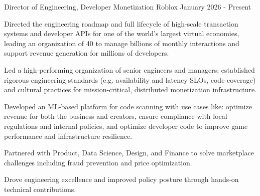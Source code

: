 

\begin{cventries}


  \cventry
    {Director of Engineering, Developer Monetization} %
    {Roblox} %
    {} %
    {January 2026 - Present} %
    {
	\begin{cvitems} %
	\item Directed the engineering roadmap and full lifecycle of high-scale transaction systems and developer APIs for one of the world's largest virtual economies, leading an organization of 40 to manage billions of monthly interactions and support revenue generation for millions of developers.
    \item Led a high-performing organization of senior engineers and managers; established rigorous engineering standards (e.g. availability and latency SLOs, code coverage) and cultural practices for mission-critical, distributed monetization infrastructure.
    \item Developed an ML-based platform for code scanning with use cases like: optimize revenue for both the business and creators, ensure compliance with local regulations and internal policies, and optimize developer code to improve game performance and infrastructure resilience.
    \item Partnered with Product, Data Science, Design, and Finance to solve marketplace challenges including fraud prevention and price optimization.
    \item Drove engineering excellence and improved policy posture through hands-on technical contributions.
	\end{cvitems}
    }


\end{cventries}
